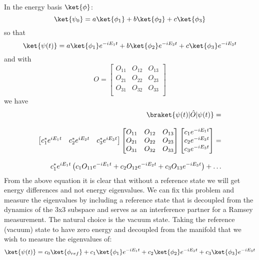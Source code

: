 In the energy basis $\ket{\phi}$:
\begin{equation*}
    \ket{\psi_0} = a\ket{\phi_1} + b\ket{\phi_2} + c\ket{\phi_3}
\end{equation*}
so that
\begin{equation*}
    \ket{\psi (t)} = a\ket{\phi_1}e^{-i E_1 t} + b\ket{\phi_2}e^{-i E_2 t} + c\ket{\phi_3}e^{-i E_3 t}
\end{equation*}
and with
\begin{equation*}
    O =
    \begin{bmatrix}
        O_{11} & O_{12} & O_{13}\\
        O_{21} & O_{22} & O_{23}\\
        O_{31} & O_{32} & O_{33}\\
    \end{bmatrix}
\end{equation*}
we have
\begin{equation*}
    \begin{aligned}
        \braket{\psi(t)|\hat{O}|\psi(t)} = \\[2.0ex]
        \begin{bmatrix}
            c_1^* e^{i E_1 t} & c_2^* e^{i E_2 t} & c_3^* e^{i E_3 t}
        \end{bmatrix}
        \begin{bmatrix}
            O_{11} & O_{12} & O_{13}\\
            O_{21} & O_{22} & O_{23}\\
            O_{31} & O_{32} & O_{33}\\
        \end{bmatrix}
        \begin{bmatrix}
            c_1 e^{-i E_1 t} \\
            c_2 e^{-i E_2 t} \\
            c_3 e^{-i E_3 t}
        \end{bmatrix} = \\[2.0 ex]
        c_1^* e^{i E_1 t} \left( c_1 O_{11} e^{-i E_1 t} + c_2 O_{12} e^{-i E_2 t} + c_3 O_{13} e^{-i E_3 t} \right) + \mathellipsis
    \end{aligned}
\end{equation*}
From the above equation it is clear that without a reference state we will get energy differences and not energy eigenvalues.
We can fix this problem and measure the eigenvalues by including a reference state that is decoupled from the dynamics of the 3x3 subspace and serves as an interference partner for a Ramsey measurement.
The natural choice is the vacuum state.
Taking the reference (vacuum) state to have zero energy and decoupled from the manifold that we wish to measure the eigenvalues of:
\begin{equation*}
    \ket{\psi (t)} = c_0\ket{\phi_{ref}} + c_1\ket{\phi_1}e^{-i E_1 t} + c_2\ket{\phi_2}e^{-i E_2 t} + c_3\ket{\phi_3}e^{-i E_3 t}
\end{equation*}

